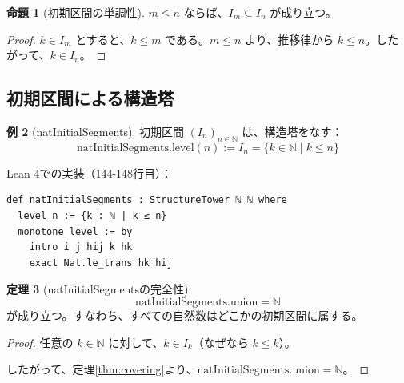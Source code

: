 \documentclass[a4paper,12pt]{ltjsarticle}
\theoremstyle{definition}
\newtheorem{theorem}{定理}[section]
\newtheorem{proposition}[theorem]{命題}
\newtheorem{example}[theorem]{例}
\newcommand{\N}{\mathbb{N}}
\begin{document}
\begin{proposition}[初期区間の単調性]
$m \leq n$ ならば、$I_m \subseteq I_n$ が成り立つ。
\end{proposition}

\begin{proof}
$k \in I_m$ とすると、$k \leq m$ である。$m \leq n$ より、推移律から $k \leq n$。したがって、$k \in I_n$。
\end{proof}

\subsection{初期区間による構造塔}

\begin{example}[natInitialSegments]\label{ex:nat_tower}
初期区間 $(I_n)_{n \in \N}$ は、構造塔をなす：
\[
\mathrm{natInitialSegments}.\mathrm{level}(n) := I_n = \{k \in \N \mid k \leq n\}
\]

Lean 4での実装（144-148行目）：
\begin{verbatim}
def natInitialSegments : StructureTower ℕ ℕ where
  level n := {k : ℕ | k ≤ n}
  monotone_level := by
    intro i j hij k hk
    exact Nat.le_trans hk hij
\end{verbatim}
\end{example}

\begin{center}
\end{center}

\begin{theorem}[natInitialSegmentsの完全性]\label{thm:nat_complete}
\[
\mathrm{natInitialSegments}.\mathrm{union} = \N
\]
が成り立つ。すなわち、すべての自然数はどこかの初期区間に属する。
\end{theorem}

\begin{proof}
任意の $k \in \N$ に対して、$k \in I_k$（なぜなら $k \leq k$）。

したがって、定理\ref{thm:covering}より、$\mathrm{natInitialSegments}.\mathrm{union} = \N$。
\end{proof}
\end{document}
